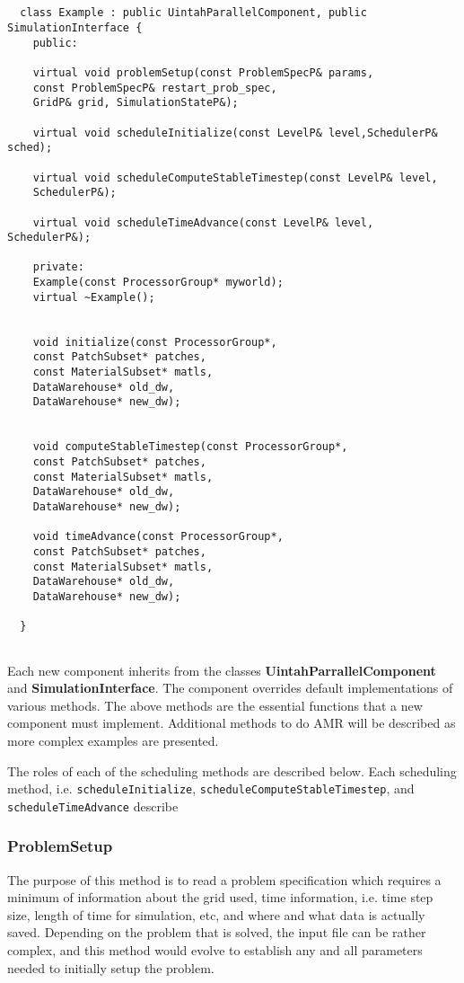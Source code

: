 \documentclass[11pt,fleqn]{book} %
\begin{document}
\begin{lstlisting}


  class Example : public UintahParallelComponent, public SimulationInterface {
    public:

    virtual void problemSetup(const ProblemSpecP& params, 
    const ProblemSpecP& restart_prob_spec, 
    GridP& grid, SimulationStateP&);

    virtual void scheduleInitialize(const LevelP& level,SchedulerP& sched);
    
    virtual void scheduleComputeStableTimestep(const LevelP& level, 
    SchedulerP&);
    
    virtual void scheduleTimeAdvance(const LevelP& level, SchedulerP&);

    private:
    Example(const ProcessorGroup* myworld);
    virtual ~Example();


    void initialize(const ProcessorGroup*,
    const PatchSubset* patches, 
    const MaterialSubset* matls,
    DataWarehouse* old_dw, 
    DataWarehouse* new_dw);
    
    
    void computeStableTimestep(const ProcessorGroup*,
    const PatchSubset* patches,
    const MaterialSubset* matls,
    DataWarehouse* old_dw,
    DataWarehouse* new_dw);
    
    void timeAdvance(const ProcessorGroup*,
    const PatchSubset* patches,
    const MaterialSubset* matls,
    DataWarehouse* old_dw,
    DataWarehouse* new_dw);

  }


\end{lstlisting}


Each new component inherits from the classes
\textbf{UintahParrallelComponent} and \textbf{SimulationInterface}.
The component overrides default implementations of various methods.
The above methods are the essential functions that a new component
must implement.  Additional methods to do AMR will be described as
more complex examples are presented.

The roles of each of the scheduling methods are described below.  Each
scheduling method, i.e. \texttt{scheduleInitialize},
\texttt{scheduleComputeStableTimestep}, and
\texttt{scheduleTimeAdvance} describe

\subsubsection{ProblemSetup}

The purpose of this method is to read a problem specification which
requires a minimum of information about the grid used, time
information, i.e. time step size, length of time for simulation, etc,
and where and what data is actually saved.  Depending on the problem
that is solved, the input file can be rather complex, and this method
would evolve to establish any and all parameters needed to initially
setup the problem.
\end{document}

